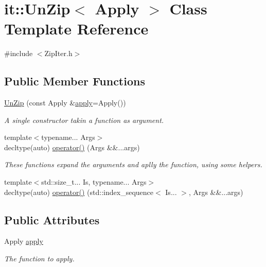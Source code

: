 \hypertarget{structit_1_1UnZip}{}\section{it\+:\+:Un\+Zip$<$ Apply $>$ Class Template Reference}
\label{structit_1_1UnZip}


{\ttfamily \#include $<$Zip\+Iter.\+h$>$}

\subsection*{Public Member Functions}
\begin{DoxyCompactItemize}
\item 
\hyperlink{structit_1_1UnZip_a2ff5a7ee51d35930693d37f1c850ae11}{Un\+Zip} (const Apply \&\hyperlink{structit_1_1UnZip_aac432c3c64ff81db0f39c7cc86a6b496}{apply}=Apply())
\begin{DoxyCompactList}\small\item\em A single constructor takin a function as argument. \end{DoxyCompactList}\item 
{\footnotesize template$<$typename... Args$>$ }\\decltype(auto) \hyperlink{structit_1_1UnZip_a2231e68495ac48e8d72962c403bac9f3}{operator()} (Args \&\&...args)
\begin{DoxyCompactList}\small\item\em These functions expand the arguments and aplly the function, using some helpers. \end{DoxyCompactList}\item 
{\footnotesize template$<$std\+::size\+\_\+t... Is, typename... Args$>$ }\\decltype(auto) \hyperlink{structit_1_1UnZip_a6ede925170e870205d6f0d560cfa2fae}{operator()} (std\+::index\+\_\+sequence$<$ Is... $>$, Args \&\&...args)
\end{DoxyCompactItemize}
\subsection*{Public Attributes}
\begin{DoxyCompactItemize}
\item 
Apply \hyperlink{structit_1_1UnZip_aac432c3c64ff81db0f39c7cc86a6b496}{apply}
\begin{DoxyCompactList}\small\item\em The function to apply. \end{DoxyCompactList}\end{DoxyCompactItemize}


